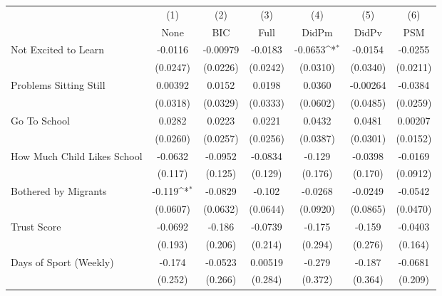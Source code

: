 {
\def\sym#1{\ifmmode^{#1}\else\(^{#1}\)\fi}
\begin{tabular}{l*{6}{c}}
\toprule
            &\multicolumn{1}{c}{(1)}&\multicolumn{1}{c}{(2)}&\multicolumn{1}{c}{(3)}&\multicolumn{1}{c}{(4)}&\multicolumn{1}{c}{(5)}&\multicolumn{1}{c}{(6)}\\
            &\multicolumn{1}{c}{None}&\multicolumn{1}{c}{BIC}&\multicolumn{1}{c}{Full}&\multicolumn{1}{c}{DidPm}&\multicolumn{1}{c}{DidPv}&\multicolumn{1}{c}{PSM}\\
\midrule
Not Excited to Learn&     -0.0116         &    -0.00979         &     -0.0183         &     -0.0653\sym{*}  &     -0.0154         &     -0.0255         \\
            &    (0.0247)         &    (0.0226)         &    (0.0242)         &    (0.0310)         &    (0.0340)         &    (0.0211)         \\
\addlinespace
Problems Sitting Still&     0.00392         &      0.0152         &      0.0198         &      0.0360         &    -0.00264         &     -0.0384         \\
            &    (0.0318)         &    (0.0329)         &    (0.0333)         &    (0.0602)         &    (0.0485)         &    (0.0259)         \\
\addlinespace
Go To School&      0.0282         &      0.0223         &      0.0221         &      0.0432         &      0.0481         &     0.00207         \\
            &    (0.0260)         &    (0.0257)         &    (0.0256)         &    (0.0387)         &    (0.0301)         &    (0.0152)         \\
\addlinespace
How Much Child Likes School&     -0.0632         &     -0.0952         &     -0.0834         &      -0.129         &     -0.0398         &     -0.0169         \\
            &     (0.117)         &     (0.125)         &     (0.129)         &     (0.176)         &     (0.170)         &    (0.0912)         \\
\addlinespace
Bothered by Migrants&      -0.119\sym{*}  &     -0.0829         &      -0.102         &     -0.0268         &     -0.0249         &     -0.0542         \\
            &    (0.0607)         &    (0.0632)         &    (0.0644)         &    (0.0920)         &    (0.0865)         &    (0.0470)         \\
\addlinespace
Trust Score &     -0.0692         &      -0.186         &     -0.0739         &      -0.175         &      -0.159         &     -0.0403         \\
            &     (0.193)         &     (0.206)         &     (0.214)         &     (0.294)         &     (0.276)         &     (0.164)         \\
\addlinespace
Days of Sport (Weekly)&      -0.174         &     -0.0523         &     0.00519         &      -0.279         &      -0.187         &     -0.0681         \\
            &     (0.252)         &     (0.266)         &     (0.284)         &     (0.372)         &     (0.364)         &     (0.209)         \\
\bottomrule
\end{tabular}
}
